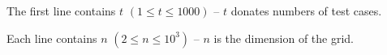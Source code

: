 The first line contains $t$ $(1 \le t \le 1000)$ -- $t$ donates numbers of test cases.

Each line contains $n$ $(2 \le n \le 10^3)$ -- $n$ is the dimension of the grid.
